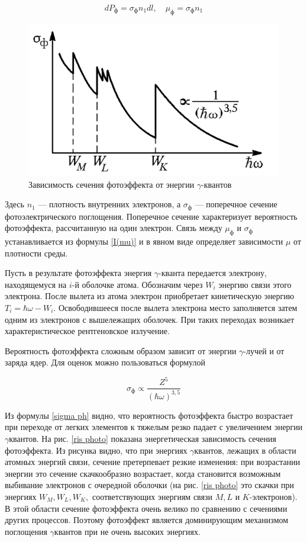 		\begin{equation}\label{mu ph}
		dP_ф = \sigma_ф n_1 dl, \quad \mu_ф = \sigma_ф n_1
		\end{equation}
		
		\begin{figure}[h!]
			\centering
			\includegraphics[width=0.6\linewidth]{pics/dep.png}
			\caption{Зависимость сечения фотоэффекта от энергии $\gamma$-квантов}
			\label{ris mu}
		\end{figure}

		Здесь $ n_1 $ --- плотность внутренних электронов, а $ \sigma_ф $ --- поперечное сечение фотоэлектрического поглощения. Поперечное сечение характеризует вероятность фотоэффекта, рассчитанную на один электрон. Связь между $ \mu_ф $ и $ \sigma_ф $ устанавливается из формулы \eqref{I(mu)} и в явном виде определяет зависимости $ \mu $ от плотности среды.
		
		Пусть в результате фотоэффекта энергия $\gamma$-кванта передается
		электрону, находящемуся на $ i $-й оболочке атома. Обозначим через $ W_i $
		энергию связи этого электрона. После вылета из атома электрон приобретает кинетическую энергию $ T_i = \hbar \omega - W_i $.
		Освободившееся после вылета электрона место заполняется затем
		одним из электронов с вышележащих оболочек. При таких переходах
		возникает характеристическое рентгеновское излучение.
	
		
		Вероятность фотоэффекта сложным образом зависит от энергии
		$\gamma$-лучей и от заряда ядер. Для оценок можно пользоваться формулой
		
		\begin{equation}\label{sigma ph}
		\sigma_ф \propto \dfrac{Z^5}{(\hbar\omega)^{3,5}}
		\end{equation}
		
		Из формулы \eqref{sigma ph} видно, что вероятность фотоэффекта быстро возрастает при переходе от легких элементов к тяжелым резко падает с увеличением энергии $\gamma$квантов. На рис. \ref{ris photo} показана энергетическая зависимость сечения фотоэффекта. Из рисунка видно, что при энергиях $\gamma$квантов, лежащих в области атомных энергий связи, сечение претерпевает резкие изменения: при возрастании энергии это сечение скачкообразно возрастает, когда становится возможным выбивание электронов с очередной оболочки (на рис. \ref{ris photo} это скачки при энергиях $ W_M, W_L, W_K, $ соответствующих энергиям связи $ M, L $  и $ K $-электронов). В этой области сечение фотоэффекта очень велико по сравнению с сечениями других процессов. Поэтому фотоэффект является доминирующим механизмом поглощения $\gamma$квантов при не очень высоких энергиях.
		

